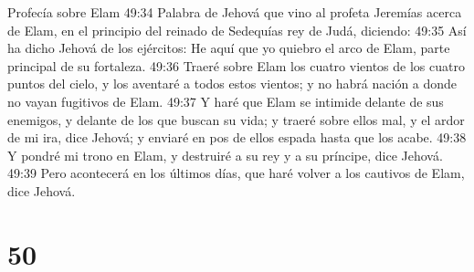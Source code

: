 Profecía sobre Elam  
49:34 Palabra de Jehová que vino al profeta Jeremías acerca de Elam, en el principio del reinado de Sedequías rey de Judá, diciendo:  
49:35 Así ha dicho Jehová de los ejércitos: He aquí que yo quiebro el arco de Elam, parte principal de su fortaleza.  
49:36 Traeré sobre Elam los cuatro vientos de los cuatro puntos del cielo, y los aventaré a todos estos vientos; y no habrá nación a donde no vayan fugitivos de Elam.  
49:37 Y haré que Elam se intimide delante de sus enemigos, y delante de los que buscan su vida; y traeré sobre ellos mal, y el ardor de mi ira, dice Jehová; y enviaré en pos de ellos espada hasta que los acabe.  
49:38 Y pondré mi trono en Elam, y destruiré a su rey y a su príncipe, dice Jehová.  
49:39 Pero acontecerá en los últimos días, que haré volver a los cautivos de Elam, dice Jehová.  

\chapter{50}

